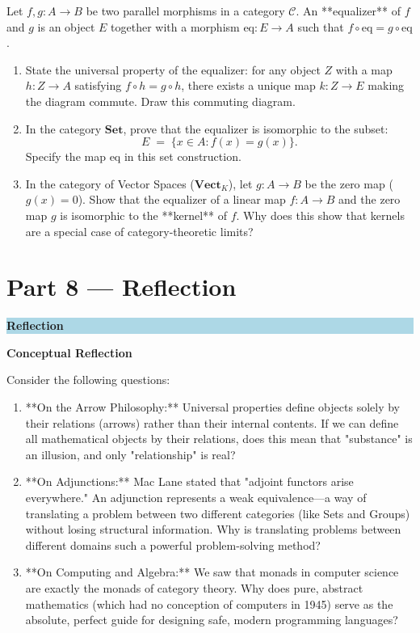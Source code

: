 \documentclass[12pt, a4paper]{article}
\newenvironment{reflectionbox}
  {\par\medskip\fillcolorbox{LightBlue}{ReflectColor}{Reflection}}
  {\par\medskip}
\newcommand{\fillcolorbox}[3]{%
  \noindent
  \filldrawbox{#1}{#2}{\textbf{\sffamily\color{white}#3}}\par\nobreak\vspace{4pt}
}
\newcommand{\filldrawbox}[3]{%
  \colorbox{#1}{\parbox{\dimexpr\linewidth-2\fboxsep\relax}{%
    \vspace{4pt}\noindent\hspace{4pt}#3\vspace{4pt}%
  }}%
}
\begin{document}
\begin{enumerate}[label=\textbf{D\arabic*.}]
        Let $f, g: A \to B$ be two parallel morphisms in a category $\mathcal{C}$.
        An **equalizer** of $f$ and $g$ is an object $E$ together with a morphism $\text{eq}: E \to A$ such that $f \circ \text{eq} = g \circ \text{eq}$.
        \begin{enumerate}[label=(\alph*)]
          \item State the universal property of the equalizer: for any object $Z$ with a map $h: Z \to A$ satisfying $f \circ h = g \circ h$, there exists a unique map $k: Z \to E$ making the diagram commute. Draw this commuting diagram.
          \item In the category $\mathbf{Set}$, prove that the equalizer is isomorphic to the subset:
          \[
            E \;=\; \{x \in A : f(x) = g(x)\}.
          \]
          Specify the map $\text{eq}$ in this set construction.
          \item In the category of Vector Spaces ($\mathbf{Vect}_K$), let $g: A \to B$ be the zero map ($g(x) = 0$).
                Show that the equalizer of a linear map $f: A \to B$ and the zero map $g$ is isomorphic to the **kernel** of $f$.
                Why does this show that kernels are a special case of category-theoretic limits?
        \end{enumerate}
\end{enumerate}

\newpage

\section{Part 8 --- Reflection}

\begin{reflectionbox}
\textbf{Conceptual Reflection}

Consider the following questions:
\begin{enumerate}
  \item **On the Arrow Philosophy:** Universal properties define objects solely by their relations (arrows) rather than their internal contents. If we can define all mathematical objects by their relations, does this mean that "substance" is an illusion, and only "relationship" is real?
  \item **On Adjunctions:** Mac Lane stated that "adjoint functors arise everywhere." An adjunction represents a weak equivalence—a way of translating a problem between two different categories (like Sets and Groups) without losing structural information. Why is translating problems between different domains such a powerful problem-solving method?
  \item **On Computing and Algebra:** We saw that monads in computer science are exactly the monads of category theory. Why does pure, abstract mathematics (which had no conception of computers in 1945) serve as the absolute, perfect guide for designing safe, modern programming languages?
\end{enumerate}
\end{reflectionbox}
\end{document}
